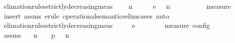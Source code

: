 \begin{isabellebody}
\endisatagproof
{\isafoldproof}%
%
\isadelimproof
\isanewline
%
\endisadelimproof
\isanewline
{}\isamarkupfalse%
\ elimation{\isacharunderscore}rules{\isacharunderscore}strictly{\isacharunderscore}decreasing{\isacharunderscore}meas{\isacharcolon}\isanewline
\ \ \ {\isacartoucheopen}{\isacharparenleft}{\isasymGamma}\ n\ {\isasymturnstile}\ {\isasymPsi}\ {\isasymtriangleright}\ {\isasymPhi}\ \ {\isasymhookrightarrow}\isactrlsub e\ \ {\isacharparenleft}{\isasymGamma}\ n\ {\isasymturnstile}\ {\isasymPsi}\ {\isasymtriangleright}\ {\isasymPhi}\isanewline
\ \ \ {\isacartoucheopen}{\isacharparenleft}{\isasymPsi}\ {\isasymPsi}\ {\isasymin}\ measure\ {\isasymmu}{\isacartoucheclose}\isanewline
%
\isadelimproof
%
\endisadelimproof
%
\isatagproof
{}\isamarkupfalse%
\ {\isacharparenleft}insert\ assms{\isacharcomma}\ erule\ operational{\isacharunderscore}semantics{\isacharunderscore}elim{\isachardot}cases{\isacharcomma}\ auto{\isacharparenright}%
\endisatagproof
{\isafoldproof}%
%
\isadelimproof
\isanewline
%
\endisadelimproof
\isanewline
{}\isamarkupfalse%
\ elimation{\isacharunderscore}rules{\isacharunderscore}strictly{\isacharunderscore}decreasing{\isacharunderscore}meas{\isacharprime}{\isacharcolon}\isanewline
\ \ \ {\isacartoucheopen}{\isasymS}\ \ {\isasymhookrightarrow}\isactrlsub e\ \ {\isasymS}\isanewline
\ \ \ {\isacartoucheopen}{\isacharparenleft}{\isasymS}\ {\isasymS}\ {\isasymin}\ measure\ {\isasymmu}\isactrlsub c\isactrlsub o\isactrlsub n\isactrlsub f\isactrlsub i\isactrlsub g{\isacartoucheclose}\isanewline
%
\isadelimproof
%
\endisadelimproof
%
\isatagproof
{}\isamarkupfalse%
\ {\isacharminus}\isanewline
\ \ \isamarkupfalse%
\ assms\ \isamarkupfalse%
\ {\isasymGamma}\ n\ {\isasymPsi}\ {\isasymPhi}\ \ p{}{\isacharcolon}{\isacartoucheopen}{\isasymS}\ {\isacharequal}\ {\isacharparenleft}{\isasymGamma}\ n\ {\isasymturnstile}\ {\isasymPsi}\ {\isasymtriangleright}\ {\isasymPhi}\isanewline

\end{isabellebody}
